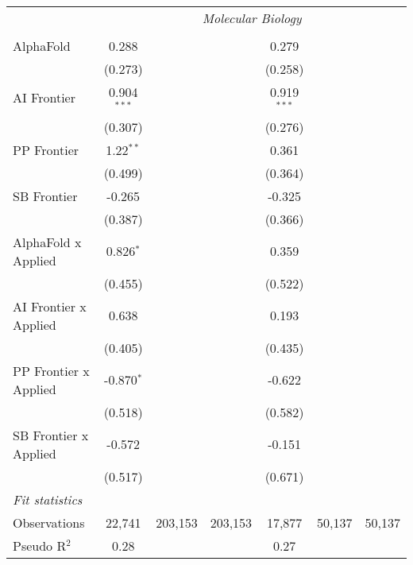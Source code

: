 \begin{tabular}{lcccccc}
 & \multicolumn{6}{c}{\textit{Molecular Biology}} \\ \\
   AlphaFold             & 0.288         &         &         & 0.279         &        &   \\   
                         & (0.273)       &         &         & (0.258)       &        &   \\   
   AI Frontier           & 0.904$^{***}$ &         &         & 0.919$^{***}$ &        &   \\   
                         & (0.307)       &         &         & (0.276)       &        &   \\   
   PP Frontier           & 1.22$^{**}$   &         &         & 0.361         &        &   \\   
                         & (0.499)       &         &         & (0.364)       &        &   \\   
   SB Frontier           & -0.265        &         &         & -0.325        &        &   \\   
                         & (0.387)       &         &         & (0.366)       &        &   \\   
   AlphaFold x Applied   & 0.826$^{*}$   &         &         & 0.359         &        &   \\   
                         & (0.455)       &         &         & (0.522)       &        &   \\   
   AI Frontier x Applied & 0.638         &         &         & 0.193         &        &   \\   
                         & (0.405)       &         &         & (0.435)       &        &   \\   
   PP Frontier x Applied & -0.870$^{*}$  &         &         & -0.622        &        &   \\   
                         & (0.518)       &         &         & (0.582)       &        &   \\   
   SB Frontier x Applied & -0.572        &         &         & -0.151        &        &   \\   
                         & (0.517)       &         &         & (0.671)       &        &   \\   
   \midrule
   \emph{Fit statistics}\\
   Observations          & 22,741        & 203,153 & 203,153 & 17,877        & 50,137 & 50,137\\  
   Pseudo R$^2$          & 0.28          &         &         & 0.27          &        & \\  
   

\end{tabular}
